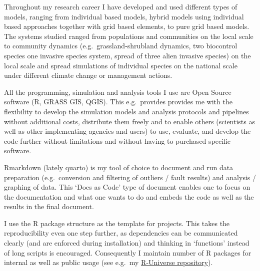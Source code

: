 \documentclass[a4paper]{article}
\begin{document}
    


Throughout my research career I have developed and used different types of
	models, ranging from individual based models, hybrid models using
	individual based approaches together with grid based elements, to pure
	grid based models. The systems studied ranged from populations and
	communities on the local scale to community dynamics (e.g.\ 
	grassland-shrubland dynamics, two biocontrol species one invasive species system,
	spread of three alien invasive species) on the local scale and spread
	simulations of individual species on the national scale under different
	climate change or management actions.

All the programming, simulation and analysis tools I use are Open
	Source software (R, GRASS GIS, QGIS). This e.g.\ provides provides me
	with the flexibility to develop the simulation models and analysis
	protocols and pipelines without additional costs, distribute them
	freely and to enable others (scientists as well as other implementing
	agencies and users) to use, evaluate, and develop the code further
	without limitations and without having to purchased specific
	software. 
	
Rmarkdown (lately quarto) is my tool of choice to document and run data
	preparation (e.g.\ conversion and filtering of outliers / fault
	results) and analysis / graphing of data. This `Docs as Code' type of
	document enables one to focus on the documentation and what one wants
	to do and embeds the code as well as the results in the final document.

I use the R package structure as the template for projects. This takes
	the reproducibility even one step further, as dependencies can be
	communicated clearly (and are enforced during installation) and
	thinking in `functions' instead of long scripts is encouraged.
	Consequently I maintain number of R packages for internal as well as
	public usage (see e.g.\ my
	\href{https://rkrug.r-universe.dev/builds}{R-Universe repository}).
\end{document}
